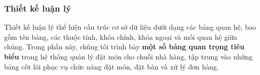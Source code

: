 





\subsubsection{Thiết kế luận lý}

Thiết kế luận lý thể hiện cấu trúc cơ sở dữ liệu dưới dạng các bảng quan hệ, bao gồm tên bảng, các thuộc tính, khóa chính, khóa ngoại và mối quan hệ giữa chúng. Trong phần này, chúng tôi trình bày \textbf{một số bảng quan trọng tiêu biểu} trong hệ thống quản lý đặt món cho chuỗi nhà hàng, tập trung vào những bảng cốt lõi phục vụ chức năng đặt món, đặt bàn và xử lý đơn hàng.
    
